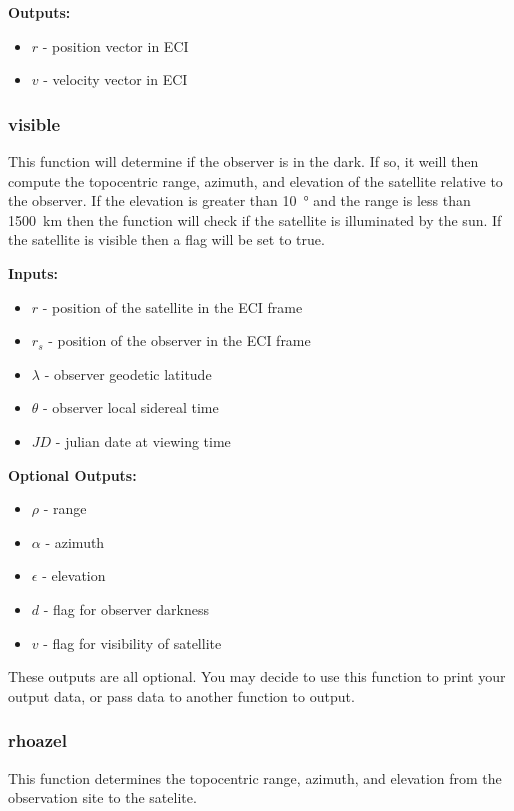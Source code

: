 \documentclass[11pt, reqno]{article}    %
\begin{document}
\noindent \textbf{Outputs: }
\begin{itemize}
    \item \( r \) -  position vector in ECI
    \item \( v \) - velocity vector in ECI
\end{itemize}

\subsubsection*{\textbf{visible} }
This function will determine if the observer is in the dark.
If so, it weill then compute the topocentric range, azimuth, and elevation of the satellite relative to the observer.
If the elevation is greater than \SI{10}{\degree} and the range is less than \SI{1500}{\kilo\meter} then the function will check if the satellite is illuminated by the sun.
If the satellite is visible then a flag will be set to true.

\noindent \textbf{Inputs: }
\begin{itemize}
    \item \( r \) -  position of the satellite in the ECI frame
    \item \( r_s \) - position of the observer in the ECI frame
    \item \( \lambda \) - observer geodetic latitude
    \item \( \theta \) - observer local sidereal time
    \item \( JD \) - julian date at viewing time
\end{itemize}

\noindent \textbf{Optional Outputs: }
\begin{itemize}
    \item \( \rho \) - range 
    \item \( \alpha \) - azimuth
    \item \( \epsilon \) - elevation
    \item \( d \) - flag for observer darkness
    \item \( v \) - flag for visibility of satellite
\end{itemize}

These outputs are all optional. 
You may decide to use this function to print your output data, or pass data to another function to output. 

\subsubsection*{rhoazel}
This function determines the topocentric range, azimuth, and elevation from the observation site to the satelite.
\end{document}
